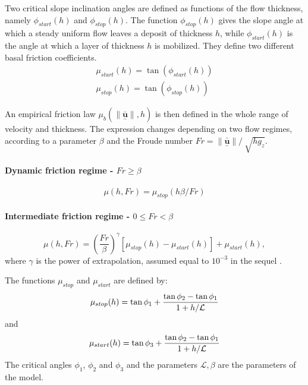 \documentclass{article}
\begin{document}
Two critical slope inclination angles are defined as functions of the flow thickness, namely $\phi_{start}(h)$ and $\phi_{stop}(h)$. The function $\phi_{stop}(h)$ gives the slope angle at which a steady uniform flow leaves a deposit of thickness $h$, while $\phi_{start}(h)$ is the angle at which a layer of thickness $h$ is mobilized. They define two different basal friction coefficients.
\begin{eqnarray}
\mu_{start}(h)=\tan(\phi_{start}(h))\\
\mu_{stop}(h)=\tan(\phi_{stop}(h))
\end{eqnarray}

An empirical friction law $\mu_{b}(\|\underset{^\sim}{\bar{\textbf{u}}} \| , h)$ is then defined in the whole range of velocity and thickness. The expression changes depending on two flow regimes, according to a parameter $\beta$ and the Froude number $Fr=\| \underset{^\sim}{\bar{\textbf{u}}} \| / \ \sqrt{h g_{z}}$.

\paragraph{Dynamic friction regime - $Fr \ge \beta$}
\begin{equation}\label{mu_beta1}
\mu(h, Fr)=\mu_{stop}(h \beta / Fr)
\end{equation}

\paragraph{Intermediate friction regime - $0 \le Fr < \beta$}
\begin{equation}\label{mu_beta2}
\mu(h, Fr)=\left(\frac{Fr}{\beta}\right)^\gamma [\mu_{stop}(h)-\mu_{start}(h)] + \mu_{start}(h),
\end{equation}
where $\gamma$ is the power of extrapolation, assumed equal to $10^{-3}$ in the sequel \citep{PouliquenForterre2002}.

The functions $\mu_{stop}$ and $\mu_{start}$ are defined by:
\begin{equation}\label{mu-stop}
\mu_{stop}(h)=\tan\phi_{1} + \frac{\tan\phi_{2}-\tan\phi_{1}}{1+h/\it \mathcal{L}}
\end{equation}
and
\begin{equation}\label{mu-start}
\mu_{start}(h)=\tan\phi_{3} + \frac{\tan\phi_{2}-\tan\phi_{1}}{1+h/\it \mathcal{L}}
\end{equation}
The critical angles $\phi_{1}$, $\phi_{2}$ and $\phi_{3}$ and the parameters $\mathcal{L}, \beta$ are the parameters of the model.
\end{document}
